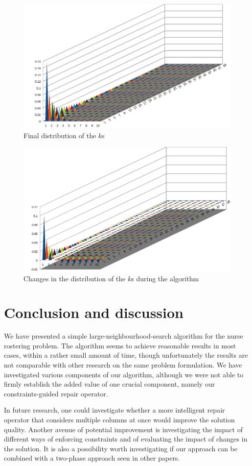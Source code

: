 \documentclass{article}
\begin{document}
\begin{figure}
	\includegraphics[width=\linewidth]{"kdist.png"}
	\caption{Final distribution of the $k$s}
	\label{finaldist}
\end{figure}

\begin{figure}
	\includegraphics[width=\linewidth]{"kdist-diff.png"}
	\caption{Changes in the distribution of the $k$s during the algorithm}
	\label{distdiff}
\end{figure}

\section{Conclusion and discussion}

We have presented a simple large-neighbourhood-search algorithm for the nurse rostering problem.
The algorithm seems to achieve reasonable results in most cases, within a rather small amount of time, though unfortunately the results are not comparable with other research on the same problem formulation.
We have investigated various components of our algorithm, although we were not able to firmly establish the added value of one crucial component, namely our constraints-guided repair operator.

In future research, one could investigate whether a more intelligent repair operator that considers multiple columns at once would improve the solution quality.
Another avenue of potential improvement is investigating the impact of different ways of enforcing constraints and of evaluating the impact of changes in the solution.
It is also a possibility worth investigating if our approach can be combined with a two-phase approach seen in other papers.

\printbibliography
\end{document}
